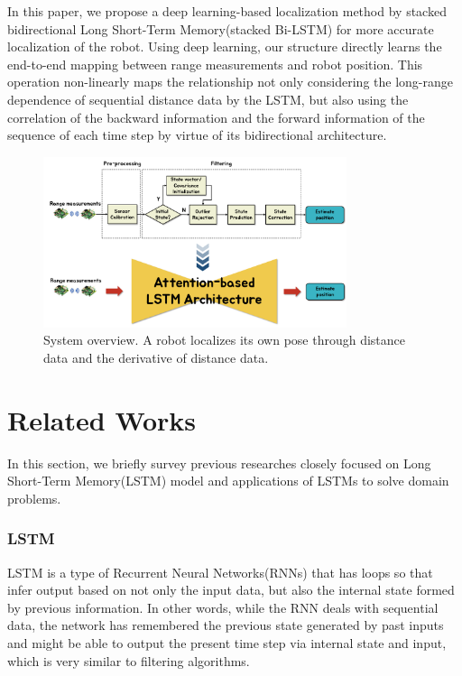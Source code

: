 \documentclass[letterpaper, 10 pt, conference]{ieeeconf}  %
\begin{document}
 In this paper, we propose a deep learning-based localization method by stacked bidirectional Long Short-Term Memory(stacked Bi-LSTM) for more accurate localization of the robot. Using deep learning, our structure directly learns the end-to-end mapping between range measurements and robot position. This operation non-linearly maps the relationship not only considering the long-range dependence of sequential distance data by the LSTM, but also using the correlation of the backward information and the forward information of the sequence of each time step by virtue of its bidirectional architecture.
 
\begin{figure}[h]
	
	\centering
	\includegraphics[height=5cm]{CE554_traditional_to_RNN}
		
	\label{fig:example}

	\caption{System overview. A robot localizes its own pose through distance data and the derivative of distance data. }
	
\end{figure}

\section{Related Works}

In this section, we briefly survey previous researches closely focused on 
Long Short-Term Memory(LSTM) model and applications of LSTMs to solve domain problems.


\subsubsection{LSTM}

LSTM is a type of Recurrent Neural Networks(RNNs) that has loops so that infer output based on not only the input data, but also the internal state formed by previous information. In other words, while the RNN deals with sequential data, the network has remembered the previous state generated by past inputs and might be able to output the present time step via internal state and input, which is very similar to filtering algorithms.
\end{document}

